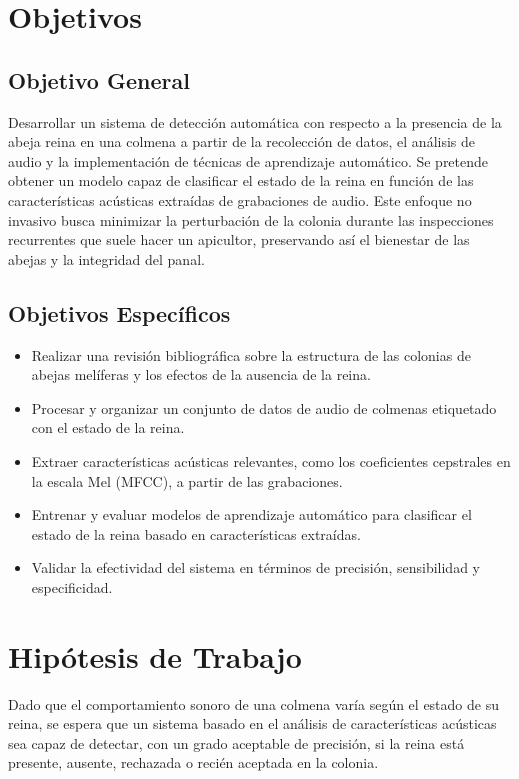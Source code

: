 \documentclass[12pt]{report}
\newenvironment{tightmulticols}{%
  \begin{multicols}{2}
  \setlength{\parskip}{0pt}
  \setlength{\parindent}{0em}
  \linespread{1}\selectfont
}{%
  \end{multicols}
}
\begin{document}
\begin{tightmulticols}

\section{Objetivos}

\subsection{Objetivo General}

\par Desarrollar un sistema de detección automática con respecto a la presencia de la abeja reina en una colmena a partir de la recolección de datos, el análisis de audio y la implementación de técnicas de aprendizaje automático. Se pretende obtener un modelo capaz de clasificar el estado de la reina en función de las características acústicas extraídas de grabaciones de audio. Este enfoque no invasivo busca minimizar la perturbación de la colonia durante las inspecciones recurrentes que suele hacer un apicultor, preservando así el bienestar de las abejas y la integridad del panal.

\subsection{Objetivos Específicos}

\begin{itemize}
    \item[\ding{43}] Realizar una revisión bibliográfica sobre la estructura de las colonias de abejas melíferas y los efectos de la ausencia de la reina.
    \item[\ding{43}] Procesar y organizar un conjunto de datos de audio de colmenas etiquetado con el estado de la reina.
    \item[\ding{43}] Extraer características acústicas relevantes, como los coeficientes cepstrales en la escala Mel (MFCC), a partir de las grabaciones.
    \item[\ding{43}] Entrenar y evaluar modelos de aprendizaje automático para clasificar el estado de la reina basado en características extraídas.
    \item[\ding{43}] Validar la efectividad del sistema en términos de precisión, sensibilidad y especificidad.
\end{itemize}

\section{Hipótesis de Trabajo}

\par Dado que el comportamiento sonoro de una colmena varía según el estado de su reina, se espera que un sistema basado en el análisis de características acústicas sea capaz de detectar, con un grado aceptable de precisión, si la reina está presente, ausente, rechazada o recién aceptada en la colonia.

\end{tightmulticols}
\end{document}
